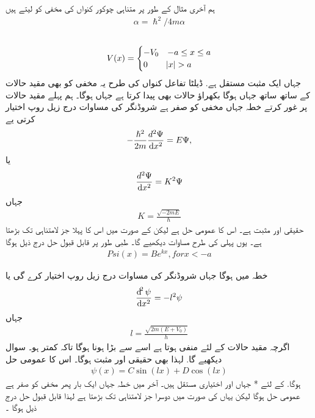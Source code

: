  ہم آخری مثال کے طور پر متناہی چوکور کنواں کی مخفی کو لیتے ہیں 
\begin{align}\alpha=\hslash^{2}/4m\alpha\end{align}\\
\begin{align} V(x)=
 \begin{cases} 
     -V_{0} & -a\le x\le a \\
      0 & \abs{x}> a
   \end{cases}
\end{align}
جہاں ایک مثبت مستقل ہے. 
 ڈیلٹا تفاعل کنواں کی طرح یہ مخفی کو بھی مقید حالات کے ساتھ ساتھ جہاں  ہوگا بکھراؤ حالات بھی پیدا  کرتا ہے جہاں ہوگا۔
ہم پہلے مقید حالات پر غور کرتے 
 خطہ  جہاں مخفی کو صفر ہے شروڈنگر کی مساوات درج زیل روپ اختیار کرتی یے
\begin{align}-\frac{\hslash^{2}}{2m} \frac{d^{2} \Psi}{\dif{x^{2}}}=E\Psi,\end{align} 
یا
 \begin{align} \frac{d^{2}\Psi}{\dif{x^{2}}}=K^{2}\Psi\end{align}
جہاں \begin{align}K=\frac{\sqrt{-2mE}}{\hslash}\end{align} حقیقی اور مثبت ہے۔  اس کا عمومی حل  ہے لیکن           کے صورت میں اس کا پہلا جز لامتناہی تک بڑھتا ہے۔ 
 یوں پہلی کی طرح مساوات دیکھیے گا۔
 طبی طور پر قابل قبول حل درج ذیل ہوگا
\begin{align} Psi(x)=Be^{kx}, for x<-a\end{align}

 خطہ  میں ہوگا جہاں شروڈنگر کی مساوات درج زیل روپ اختیار کرے گی  یا \begin{align}\frac{\dif ^{2}\psi}{\dif{x^2}}=-l^2\psi \end{align}
 جہاں\begin{align}l=\frac{\sqrt{2m(E+V_{0})}}{h}  \end{align}
 اگرچہ مقید حالات کے لئے  منفی ہوتا ہے اسے  سے بڑا ہونا ہوگا تاکہ  کمتر ہو۔  سوال  دیکھیے گا. 
 لہذا  بھی حقیقی اور مثبت ہوگا۔ اس کا عمومی حل\begin{align}\psi(x)=C\sin(lx)+D\cos(lx) \end{align}  ہوگا.  کے لئے * جہاں اور اختیاری مستقل ہیں۔  آخر میں خطہ   جہاں ایک بار پھر مخفی کو صفر ہے عمومی حل ہوگا لیکن یہاں کی صورت میں دوسرا جز  لامتناہی تک بڑھتا ہے لہذا قابل قبول حل درج ذیل ہوگا ۔

